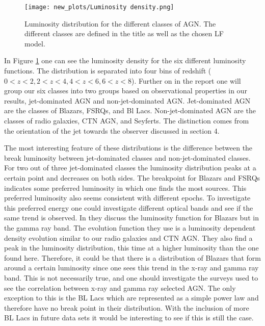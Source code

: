 \begin{figure}
    \centering
    \texttt{[image: new\_plots/Luminosity density.png]}
    \caption{Luminosity distribution for the  different classes of AGN. The different classes are defined in the title as well as the chosen LF model.}
    \label{fig:LD}
\end{figure}


In Figure \ref{fig:LD} one can see the luminosity density for the six different luminosity functions. The distribution is 
separated into four bins of redshift ($0<z<2,2<z<4,4<z<6,6<z<8$). 
Further on in the report one will group our six classes into two groups based on observational properties in our results, jet-dominated AGN and non-jet-dominated AGN. Jet-dominated AGN are the classes of Blazars, FSRQs, and Bl Lacs. Non-jet-dominated AGN are the classes of radio galaxies, CTN AGN, and Seyferts.
The distinction comes from the orientation of the jet towards the observer discussed in section 4. 

%
The most interesting feature of these distributions is the difference between the break luminosity between jet-dominated classes and non-jet-dominated classes. 
For two out of three jet-dominated classes  the luminosity distribution peaks at a certain point and decreases on both sides.  %
The breakpoint for Blazars and FSRQs indicates some preferred 
luminosity in which one finds the most sources. This preferred luminosity also seems consistent with different epochs. To investigate this preferred energy one could investigate different optical bands and see if the same trend is observed. 
In \cite{Narumoto_2006} they discuss the luminosity function for Blazars but in the gamma ray band. The evolution function they use is a luminosity dependent density evolution similar to our radio galaxies and CTN AGN. They also find a peak in the luminosity distribution, this time at a higher luminosity than the one found here.
Therefore, it could be that there is a distribution of Blazars that form around a certain luminosity since one sees this trend in the x-ray and gamma ray band. 
This is not necessarily true, and one should investigate the surveys used to see the correlation between x-ray and gamma ray selected AGN.
The only exception to this is the BL Lacs which are represented as a simple power law and therefore have no
break point in their distribution. With the inclusion of more BL Lacs in future data sets it would be interesting to see if this is still the case.

